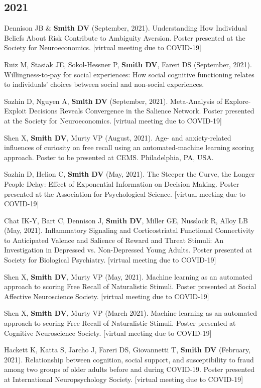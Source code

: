 \documentclass[11pt, letterpaper]{article}
\begin{document}
\subsection*{2021}
\begin{hangparas}{.5in}{1}

Dennison JB \& \textbf{Smith DV} (September, 2021). Understanding How Individual Beliefs About Risk Contribute to Ambiguity Aversion. Poster presented at the Society for Neuroeconomics. [virtual meeting due to COVID-19]

Ruiz M, Stasiak JE, Sokol-Hessner P, \textbf{Smith DV}, Fareri DS (September, 2021). Willingness-to-pay for social experiences: How social cognitive functioning relates to individuals' choices between social and non-social experiences. 

Sazhin D, Nguyen A, \textbf{Smith DV} (September, 2021). Meta-Analysis of Explore-Exploit Decisions Reveals Convergence in the Salience Network. Poster presented at the Society for Neuroeconomics. [virtual meeting due to COVID-19]

Shen X, \textbf{Smith DV}, Murty VP (August, 2021). Age- and anxiety-related influences of curiosity on free recall using an automated-machine learning scoring approach. Poster to be presented at CEMS. Philadelphia, PA, USA.

Sazhin D, Helion C, \textbf{Smith DV} (May, 2021). The Steeper the Curve, the Longer People Delay: Effect of Exponential Information on Decision Making. Poster presented at the Association for Psychological Science. [virtual meeting due to COVID-19]

Chat IK-Y, Bart C, Dennison J, \textbf{Smith DV}, Miller GE, Nusslock R, Alloy LB (May, 2021). Inflammatory Signaling and Corticostriatal Functional Connectivity to Anticipated Valence and Salience of Reward and Threat Stimuli: An Investigation in Depressed vs. Non-Depressed Young Adults. Poster presented at Society for Biological Psychiatry. [virtual meeting due to COVID-19]

Shen X, \textbf{Smith DV}, Murty VP (May, 2021). Machine learning as an automated approach to scoring Free Recall of Naturalistic Stimuli. Poster presented at Social Affective Neuroscience Society. [virtual meeting due to COVID-19]

Shen X, \textbf{Smith DV}, Murty VP (March 2021). Machine learning as an automated approach to scoring Free Recall of Naturalistic Stimuli. Poster presented at Cognitive Neuroscience Society. [virtual meeting due to COVID-19]

Hackett K, Katta S, Jarcho J, Fareri DS, Giovannetti T, \textbf{Smith DV} (February, 2021). Relationship between cognition, social support, and susceptibility to fraud among two groups of older adults before and during COVID-19. Poster presented at International Neuropsychology Society. [virtual meeting due to COVID-19] \\

\end{hangparas}
\end{document}
